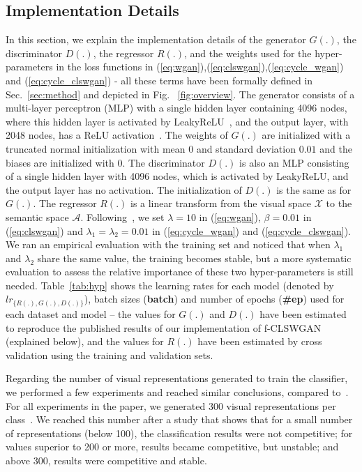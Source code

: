 \documentclass[runningheads]{llncs}
\begin{document}
%
%
%
%
\subsection{Implementation Details}

In this section, we explain the implementation details of the generator $G(.)$, the discriminator $D(.)$, the regressor $R(.)$, and the weights used for the hyper-parameters in the loss functions in (\ref{eq:wgan}),(\ref{eq:clswgan}),(\ref{eq:cycle_wgan}) and (\ref{eq:cycle_clswgan}) - all these terms have been formally defined in Sec.~\ref{sec:method} and depicted in Fig. ~\ref{fig:overview}.
The generator consists of a multi-layer perceptron (MLP) with a single hidden layer containing 4096 nodes, where this hidden layer is activated by LeakyReLU~\cite{maas2013relu}, and the output layer, with 2048 nodes, has a ReLU activation~\cite{nair2010rectified}.
The weights of $G(.)$ are initialized with a truncated normal initialization with mean 0 and standard deviation $0.01$ and the biases are initialized with $0$. 
The discriminator $D(.)$ is also an MLP consisting of a single hidden layer with 4096 nodes, which is activated by LeakyReLU, and the output layer has no activation.  The initialization of $D(.)$ is the same as for $G(.)$.  
The regressor $R(.)$ is a linear transform from the visual space $\mathcal{X}$ to the semantic space $\mathcal{A}$.
Following~\cite{XianCVPR2018}, we set $\lambda=10$ in (\ref{eq:wgan}), $\beta = 0.01$ in (\ref{eq:clswgan}) and $\lambda_1 = \lambda_2 = 0.01$ in (\ref{eq:cycle_wgan}) and (\ref{eq:cycle_clswgan}). We ran an empirical evaluation with the training set and noticed that when $\lambda_1$ and $\lambda_2$ share the same value, the training becomes stable, but a more systematic evaluation to assess the relative importance of these two hyper-parameters is still needed. Table~\ref{tab:hyp} shows the learning rates for each model (denoted by $lr_{\{ R(.), G(.), D(.)  \}}$), batch sizes (\textbf{batch}) and number of epochs (\textbf{\#ep}) used for each dataset and model -- the values for $G(.)$ and $D(.)$ have been estimated to reproduce the published results of our implementation of f-CLSWGAN (explained below), and the values for $R(.)$ have been estimated by cross validation using the training and validation sets.

Regarding the number of visual representations generated to train the classifier, we performed a few experiments and reached similar conclusions, compared to~\cite{XianCVPR2018}. For all experiments in the paper, we generated 300 visual representations per class~\cite{XianCVPR2018}. We reached this number after a study that shows that for a small number of representations (below 100), the classification results were not competitive; for values superior to 200 or more, results became competitive, but unstable; and above 300, results were competitive and stable.
\end{document}
